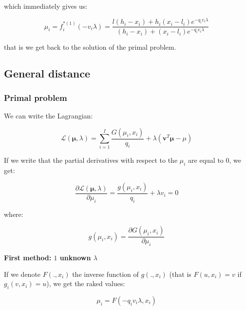 \documentclass{tex/note}
\begin{document}
which immediately gives us:

\begin{equation*}
\mu_i = f_i^{* \left( 1 \right)} \left( - v_i \lambda \right) = \frac{l \left( h_i - x_i \right) + h_i \left( x_i - l_i \right) e^{-q_i v_i \lambda}}{\left( h_i - x_i \right) + \left( x_i - l_i \right) e^{-q_i v_i \lambda}}
\end{equation*}

that is we get back to the solution of the primal problem.

\subsection{General distance}

\subsubsection{Primal problem}

We can write the Lagrangian:

\begin{equation*}
\mathcal{L} \left( \bm{\mu} , \lambda \right) = \sum_{i = 1}^I \frac{G \left( \mu_i , x_i \right)}{q_i} + \lambda \left( \bm{v}^T \bm{\mu} - \mu \right)
\end{equation*}

If we write that the partial derivatives with respect to the $\mu_i$ are equal to $0$, we get:

\begin{equation*}
\frac{\partial \mathcal{L} \left( \bm{\mu} , \lambda \right)}{\partial \mu_i} = \frac{g \left( \mu_i , x_i \right)}{q_i} + \lambda v_i = 0
\end{equation*}

where:

\begin{equation*}
g \left( \mu_i , x_i \right) = \frac{\partial G \left( \mu_i , x_i \right)}{\partial \mu_i}
\end{equation*}

\textbf{First method: $1$ unknown $\lambda$}

If we denote $F \left( . , x_i \right)$ the inverse function of $g \left( . , x_i \right)$ (that is $F \left( u , x_i \right) = v$ if $g_i \left( v , x_i \right) = u$), we get the raked values:

\begin{equation*}
\mu_i = F \left( - q_i v_i \lambda , x_i \right)
\end{equation*}
\end{document}
